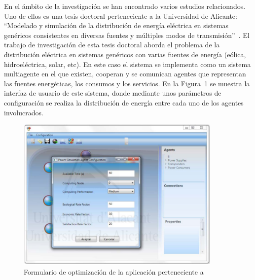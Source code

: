 En el ámbito de la investigación se han encontrado varios estudios relacionados. Uno de ellos es una tesis doctoral perteneciente a la Universidad de Alicante: ``Modelado y simulación de la distribución de energía eléctrica en sistemas genéricos consistentes en diversas fuentes y múltiples modos de transmisión''~\cite{Valdi13}. El trabajo de investigación de esta tesis doctoral aborda el problema de la distribución eléctrica en sistemas genéricos con varias fuentes de energía (eólica, hidroeléctrica, solar, etc). En este caso el sistema se implementa como un sistema multiagente en el que existen, cooperan y se comunican agentes que representan las fuentes energéticas, los consumos y los servicios. En la Figura~\ref{fig:tesis} se muestra la interfaz de usuario de este sistema, donde mediante unos parámetros de configuración se realiza la distribución de energía entre cada uno de los agentes involucrados.\\
\begin{figure}[H]
	\centering
	\includegraphics[width=10cm]{figs/tesis.png}
	\caption{Formulario de optimización de la aplicación perteneciente a~\cite{Valdi13}}
        \label{fig:tesis}
\end{figure}

